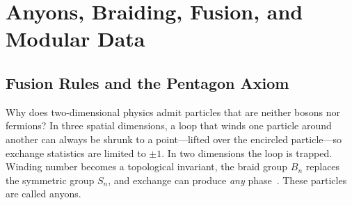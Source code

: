 %
%
%
%
%
%
%
%
%

\section{Anyons, Braiding, Fusion, and Modular Data}
\label{sec:anyons}

\subsection{Fusion Rules and the Pentagon Axiom}
\label{subsec:fusion-pentagon}

Why does two-dimensional physics admit particles that are neither bosons nor fermions?  In three spatial dimensions, a loop that winds one particle around another can always be shrunk to a point---lifted over the encircled particle---so exchange statistics are limited to $\pm 1$.  In two dimensions the loop is trapped.  Winding number becomes a topological invariant, the braid group $B_n$ replaces the symmetric group $S_n$, and exchange can produce \emph{any} phase~\cite{NayakSimonSternFreedmanDasSarma2008NonabelianAnyons}.  These particles are called anyons.

